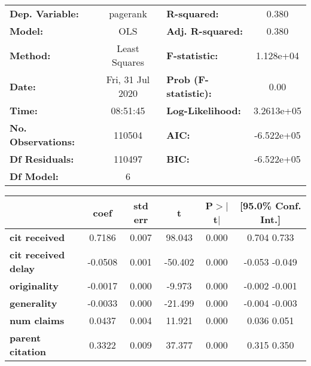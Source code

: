 \begin{center}
\begin{tabular}{lclc}
\toprule
\textbf{Dep. Variable:}     &     pagerank     & \textbf{  R-squared:         } &       0.380    \\
\textbf{Model:}             &       OLS        & \textbf{  Adj. R-squared:    } &       0.380    \\
\textbf{Method:}            &  Least Squares   & \textbf{  F-statistic:       } &   1.128e+04    \\
\textbf{Date:}              & Fri, 31 Jul 2020 & \textbf{  Prob (F-statistic):} &       0.00     \\
\textbf{Time:}              &     08:51:45     & \textbf{  Log-Likelihood:    } &   3.2613e+05   \\
\textbf{No. Observations:}  &      110504      & \textbf{  AIC:               } &   -6.522e+05   \\
\textbf{Df Residuals:}      &      110497      & \textbf{  BIC:               } &   -6.522e+05   \\
\textbf{Df Model:}          &           6      & \textbf{                     } &                \\
\bottomrule
\end{tabular}
\begin{tabular}{lccccc}
                            & \textbf{coef} & \textbf{std err} & \textbf{t} & \textbf{P$>$$|$t$|$} & \textbf{[95.0\% Conf. Int.]}  \\
\midrule
\textbf{cit received}       &       0.7186  &        0.007     &    98.043  &         0.000        &         0.704     0.733       \\
\textbf{cit received delay} &      -0.0508  &        0.001     &   -50.402  &         0.000        &        -0.053    -0.049       \\
\textbf{originality}        &      -0.0017  &        0.000     &    -9.973  &         0.000        &        -0.002    -0.001       \\
\textbf{generality}         &      -0.0033  &        0.000     &   -21.499  &         0.000        &        -0.004    -0.003       \\
\textbf{num claims}         &       0.0437  &        0.004     &    11.921  &         0.000        &         0.036     0.051       \\
\textbf{parent citation}    &       0.3322  &        0.009     &    37.377  &         0.000        &         0.315     0.350       \\

\end{tabular}
\end{center}
